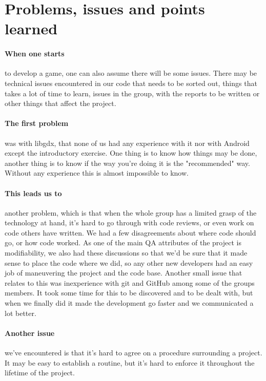 \section{Problems, issues and points learned}

\paragraph{When one starts} to develop a game, one can also assume there will be some issues. There may be technical issues encountered in our code that needs to be sorted out, things that takes a lot of time to learn, issues in the group, with the reports to be written or other things that affect the project.

\paragraph{The first problem} was with libgdx, that none of us had any experience with it nor with Android except the introductory exercise. One thing is to know how things may be done, another thing is to know if the way you're doing it is the "recommended" way. Without any experience this is almost impossible to know.

\paragraph{This leads us to} another problem, which is that when the whole group has a limited grasp of the technology at hand, it's hard to go through with code reviews, or even work on code others have written. We had a few disagreements about where code should go, or how code worked. As one of the main QA attributes of the project is modifiability, we also had these discussions so that we'd be sure that it made sense to place the code where we did, so any other new developers had an easy job of maneuvering the project and the code base. Another small issue that relates to this was inexperience with git and GitHub among some of the groups members. It took some time for this to be discovered and to be dealt with, but when we finally did it made the development go faster and we communicated a lot better. 


\paragraph{Another issue} we've encountered is that it's hard to agree on a procedure surrounding a project. It may be easy to establish a routine, but it's hard to enforce it throughout the lifetime of the project.


